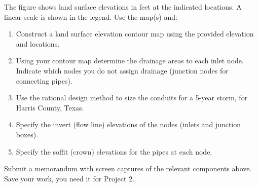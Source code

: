 \documentclass[12pt]{article}
\begin{document}
The figure shows land surface elevations in feet at the indicated locations.  
A linear scale is shown in the legend.  
Use the map(s) and:

\begin{enumerate}
\item Construct a land surface elevation contour map using the provided elevation and locations.
\item Using your contour map determine the drainage areas to each inlet node.  
Indicate which nodes you do not assign drainage (junction nodes for connecting pipes).
\item Use the rational design method to size the conduits for a 5-year storm, for Harris County, Texas.
\item Specify the invert (flow line) elevations of the nodes (inlets and junction boxes).
\item Specify the soffit (crown) elevations for the pipes at each node.
\end{enumerate}

Submit a memorandum with screen captures of the relevant components above.  Save your work, you need it for Project 2.













 
\end{document}
